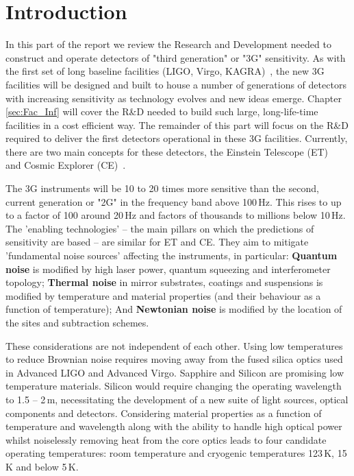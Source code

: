 \chapter{Introduction}
\label{sec:Intro}

In this part of the report we review the Research and Development needed to construct and operate detectors of "third generation" or "3G" sensitivity. As with the first set of long baseline facilities (LIGO, Virgo, KAGRA)~\cite{AdvancedVirgo2015,AdvancedLIGO2015,KAGRA2013}, the new 3G facilities will be designed and built to house a number of generations of detectors with increasing sensitivity as technology evolves and new ideas emerge. Chapter \ref{sec:Fac_Inf} will cover the R\&D needed to build such large, long-life-time facilities in a cost efficient way. The remainder of this part will focus on the R\&D required to deliver the first detectors operational in these 3G facilities. Currently, there are two main concepts for these detectors, the Einstein Telescope (ET)~\cite{ET2011} and Cosmic Explorer (CE)~\cite{CosmicExplorer2017}.

The 3G instruments will be 10 to 20 times more sensitive than the second, current generation or "2G" in the frequency band above  100\,Hz.  This rises to up to a factor of 100 around 20\,Hz and factors of thousands to millions below 10\,Hz. 
The 'enabling technologies' -- the main pillars on which the predictions of sensitivity are based --  are similar for ET and CE. They aim to mitigate 'fundamental noise sources' affecting the instruments, in particular: \textbf{Quantum noise} is modified by high laser power, quantum squeezing and interferometer topology; \textbf{Thermal noise} in mirror substrates, coatings and suspensions is modified by temperature and material properties (and their behaviour as a function of temperature); And \textbf{Newtonian noise} is modified by the location of the sites and subtraction schemes. 
   
These considerations are not independent of each other. Using low temperatures to reduce Brownian noise requires moving away from the fused silica optics used in Advanced LIGO and Advanced Virgo. Sapphire and Silicon are promising low temperature materials. Silicon would require changing the operating wavelength to 1.5 -- 2\,\micro m, necessitating the development of a new suite of light sources, optical components and detectors.  Considering material properties as a function of temperature and wavelength along with the ability to handle high optical power whilst noiselessly removing heat from the core optics leads to four candidate operating temperatures:  room temperature and cryogenic temperatures 123\,K, 15\,K and below 5\,K.  

